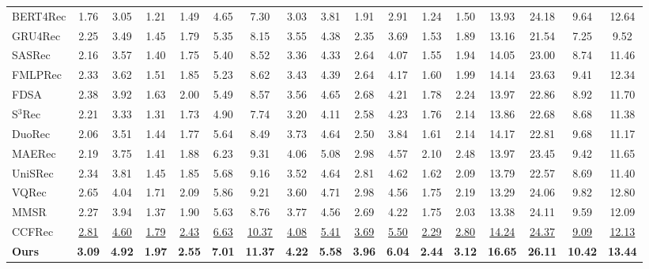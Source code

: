 \documentclass[letterpaper]{article} %
\theoremstyle{definition} %
\begin{document}
\begin{table}[t]
\begin{tabular}{@{} l cccc cccc cccc cccc @{}}
    \midrule
    BERT4Rec & 1.76 & 3.05 & 1.21 & 1.49 & 4.65 & 7.30 & 3.03 & 3.81 & 1.91 & 2.91 & 1.24 & 1.50 & 13.93 & 24.18 & 9.64 & 12.64 \\
    GRU4Rec  & 2.25 & 3.49 & 1.45 & 1.79 & 5.35 & 8.15 & 3.55 & 4.38 & 2.35 & 3.69 & 1.53 & 1.89 & 13.16 & 21.54 & 7.25 & 9.52 \\
    SASRec   & 2.16 & 3.57 & 1.40 & 1.75 & 5.40 & 8.52 & 3.36 & 4.33 & 2.64 & 4.07 & 1.55 & 1.94 & 14.05 & 23.00 & 8.74 & 11.46 \\
    FMLPRec  & 2.33 & 3.62 & 1.51 & 1.85 & 5.23 & 8.62 & 3.43 & 4.39 & 2.64 & 4.17 & 1.60 & 1.99 & 14.14 & 23.63 & 9.41 & 12.34 \\
    FDSA     & 2.38 & 3.92 & 1.63 & 2.00 & 5.49 & 8.57 & 3.56 & 4.65 & 2.68 & 4.21 & 1.78 & 2.24 & 13.97 & 22.86 & 8.92 & 11.70 \\
    S$^3$Rec & 2.21 & 3.33 & 1.31 & 1.73 & 4.90 & 7.74 & 3.20 & 4.11 & 2.58 & 4.23 & 1.76 & 2.14 & 13.86 & 22.68 & 8.68 & 11.38 \\
    DuoRec   & 2.06 & 3.51 & 1.44 & 1.77 & 5.64 & 8.49 & 3.73 & 4.64 & 2.50 & 3.84 & 1.61 & 2.14 & 14.17 & 22.81 & 9.68 & 11.17 \\
    MAERec   & 2.19 & 3.75 & 1.41 & 1.88 & 6.23 & 9.31 & 4.06 & 5.08 & 2.98 & 4.57 & 2.10 & 2.48 & 13.97 & 23.45 & 9.42 & 11.65 \\
    UniSRec  & 2.34 & 3.81 & 1.45 & 1.85 & 5.68 & 9.16 & 3.52 & 4.64 & 2.81 & 4.62 & 1.62 & 2.09 & 13.79 & 22.57 & 8.69 & 11.40 \\
    VQRec    & 2.65 & 4.04 & 1.71 & 2.09 & 5.86 & 9.21 & 3.60 & 4.71 & 2.98 & 4.56 & 1.75 & 2.19 & 13.29 & 24.06 & 9.82 & 12.80 \\
    MMSR     & 2.27 & 3.94 & 1.37 & 1.90 & 5.63 & 8.76 & 3.77 & 4.56 & 2.69 & 4.22 & 1.75 & 2.03 & 13.38 & 24.11 & 9.59 & 12.09 \\
    CCFRec   & \underline{2.81} & \underline{4.60} & \underline{1.79} & \underline{2.43} & \underline{6.63} & \underline{10.37} & \underline{4.08} & \underline{5.41} & \underline{3.69} & \underline{5.50} & \underline{2.29} & \underline{2.80} & \underline{14.24} & \underline{24.37} & \underline{9.09} & \underline{12.13} \\

    \textbf{Ours} & \textbf{3.09} & \textbf{4.92} & \textbf{1.97} & \textbf{2.55} & \textbf{7.01} & \textbf{11.37} & \textbf{4.22} & \textbf{5.58} & \textbf{3.96} & \textbf{6.04} & \textbf{2.44} & \textbf{3.12} & \textbf{16.65} & \textbf{26.11} & \textbf{10.42} & \textbf{13.44} \\


\end{tabular}
\end{table}
\end{document}
